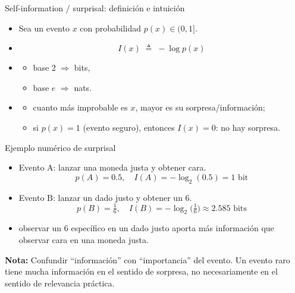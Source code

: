 \begin{frame}{Self-information / surprisal: definición e intuición}
\begin{itemize}
  \item Sea un evento \(x\) con probabilidad \(p(x)\in(0,1]\).
  \item {}
  \[
    I(x) \;\triangleq\; -\log p(x)
  \]
  \item {}
  \begin{itemize}
    \item base 2 \(\Rightarrow\) bits,
    \item base \(e\) \(\Rightarrow\) nats.
  \end{itemize}
  \item {}
  \begin{itemize}
    \item cuanto más improbable es \(x\), mayor es su sorpresa/información;
    \item si \(p(x)=1\) (evento seguro), entonces \(I(x)=0\): no hay sorpresa.
  \end{itemize}
\end{itemize}
\end{frame}

\begin{frame}{Ejemplo numérico de surprisal}
\begin{itemize}
  \item Evento A: lanzar una moneda justa y obtener cara.
  \[
    p(A)=0.5,\quad I(A) = -\log_2(0.5) = 1 \text{ bit}
  \]
  \item Evento B: lanzar un dado justo y obtener un 6.
  \[
    p(B)=\tfrac{1}{6},\quad I(B) = -\log_2\Big(\tfrac{1}{6}\Big)\approx 2.585 \text{ bits}
  \]
  \item {} observar un 6 específico en un dado justo aporta más información que observar cara en una moneda justa.
\end{itemize}

\vspace{0.5em}
\textbf{Nota:}
Confundir “información” con “importancia” del evento. Un evento raro tiene mucha información en el sentido de sorpresa, no necesariamente en el sentido de relevancia práctica.
\end{frame}


